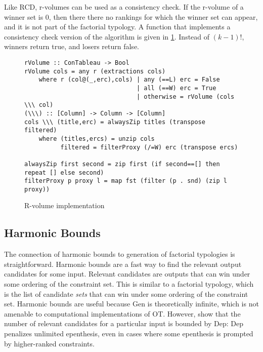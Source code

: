 \documentclass[11pt]{article}
\begin{document}
Like RCD, r-volumes can be used as a consistency check. If the
r-volume of a winner set is 0, then there there no rankings for which
the winner set can appear, and it is not part of the factorial typology. A
function that implements a consistency check version of the algorithm
is given in \ref{haskell-r-volume}. Instead of $(k-1)!$, winners
return true, and losers return false.

\begin{figure}
\begin{verbatim}
rVolume :: ConTableau -> Bool
rVolume cols = any r (extractions cols)
    where r (col@(_,erc),cols) | any (==L) erc = False
                               | all (==W) erc = True
                               | otherwise = rVolume (cols \\\ col)
(\\\) :: [Column] -> Column -> [Column]
cols \\\ (title,erc) = alwaysZip titles (transpose filtered)
    where (titles,ercs) = unzip cols
          filtered = filterProxy (/=W) erc (transpose ercs)

alwaysZip first second = zip first (if second==[] then repeat [] else second)
filterProxy p proxy l = map fst (filter (p . snd) (zip l proxy))
\end{verbatim}
  \caption{R-volume implementation}
  \label{haskell-r-volume}
\end{figure}

\subsection{Harmonic Bounds}

The connection of 
harmonic bounds to generation of factorial typologies is
straightforward. Harmonic bounds are a fast way to find the relevant output
candidates for some input. Relevant candidates are outputs that can win
under some ordering of the constraint set. This is similar to a factorial
typology, which is the list of candidate {\it sets} that can win under
some ordering of the constraint set. Harmonic bounds are
useful because {\sc Gen} is theoretically infinite, which is not
amenable to computational implementations of OT. However,
 show that the number of relevant candidates for a
particular input is bounded by {\sc Dep}: {\sc Dep}
penalizes unlimited epenthesis, even in cases where some epenthesis is
prompted by higher-ranked constraints.
\end{document}
